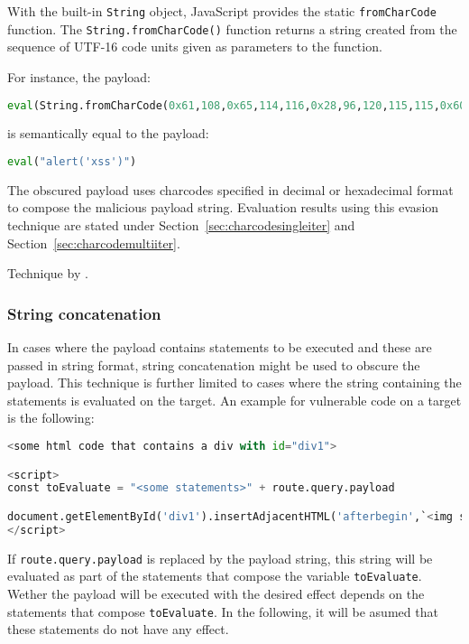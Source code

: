 With the built-in \verb|String| object, JavaScript provides the static \verb|fromCharCode| function. The \verb|String.fromCharCode()| function returns a string created from the sequence of UTF-16 code units given as parameters to the function. \cite{js/fromCharCode}

For instance, the payload:

\begin{lstlisting}[style=basicStyle, language=Python]
eval(String.fromCharCode(0x61,108,0x65,114,116,0x28,96,120,115,115,0x60,0x29))
\end{lstlisting}

is semantically equal to the payload:

\begin{lstlisting}[style=basicStyle, language=Python]
eval("alert('xss')")
\end{lstlisting}

The obscured payload uses charcodes specified in decimal or hexadecimal format to compose the malicious payload string. Evaluation results using this evasion technique are stated under Section~\ref{sec:charcodesingleiter} and Section~\ref{sec:charcodemultiiter}.

Technique by \cite{asecsite/jsobf1}.

\subsubsection{String concatenation}
\label{sec:stringconc}
In cases where the payload contains statements to be executed and these are passed in string format, string concatenation might be used to obscure the payload. This technique is further limited to cases where the string containing the statements is evaluated on the target. An example for vulnerable code on a target is the following:

\begin{lstlisting}[style=basicStyle, language=Python]
<some html code that contains a div with id="div1">

<script>
const toEvaluate = "<some statements>" + route.query.payload

document.getElementById('div1').insertAdjacentHTML('afterbegin',`<img src=0 onerror=${eval(toEvaluate)}>`)
</script>
\end{lstlisting}

If \verb|route.query.payload| is replaced by the payload string, this string will be evaluated as part of the statements that compose the variable \verb|toEvaluate|. Wether the payload will be executed with the desired effect depends on the statements that compose \verb|toEvaluate|. In the following, it will be asumed that these statements do not have any effect. 

